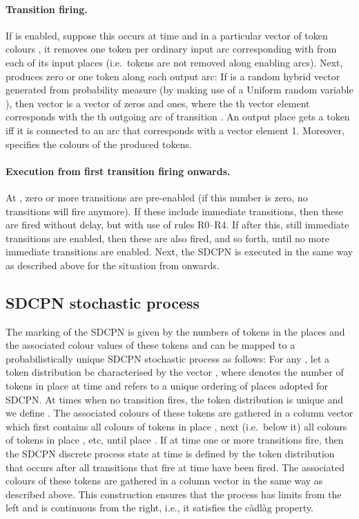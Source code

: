 \documentclass[copyright,creativecommons]{eptcs}
\begin{document}
\paragraph{Transition firing.}
If  is enabled, suppose this occurs at time 
and in a particular vector of token colours
, it removes one token per ordinary input arc corresponding
with  from each
of its input places (i.e.\ tokens are not removed along enabling arcs).
Next,  produces zero or one token along each output arc: If
 is a random hybrid
vector generated from probability measure 
(by making use of a Uniform random variable ), then
vector  is a vector of zeros and ones, where
the th vector element corresponds with the th outgoing
arc of transition . An output place gets a token iff it is
connected to an arc that corresponds with a vector element 1.
Moreover,  specifies the
colours of the produced tokens.

\paragraph{Execution from first transition firing onwards.}
At , zero or more transitions are pre-enabled (if this
number is zero, no transitions will fire anymore). If these
include immediate transitions, then these are fired without delay,
but with use of rules R0--R4. If after this, still immediate
transitions are enabled, then these are also fired, and so forth,
until no more immediate transitions are enabled.
Next, the SDCPN is executed in the same way as described above for
the situation from  onwards.


\subsection{SDCPN stochastic process}
\label{subsec:SDCPN process}

The marking of the SDCPN is given by the numbers of tokens in the
places and the associated colour values of these tokens and can be
mapped to a probabilistically unique SDCPN stochastic process
 as follows: For any , let a token
distribution be characterised by the vector , where 
denotes the number of tokens in place  at time  and  refers to a unique ordering of places adopted
for SDCPN. At times  when no transition
fires, the token distribution is unique and we define . The associated colours of these tokens are gathered in a
column vector  which first contains all colours of tokens in
place , next (i.e.\ below it) all colours of tokens in place
, etc, until place . If at time 
one or more transitions fire, then the SDCPN discrete process
state at time  is defined by  the token
distribution that occurs after all transitions that fire at time
 have been fired. The associated colours of these tokens
are gathered in a column vector  in the same way as
described above. This construction ensures that the process
 has limits from the left and is continuous from the
right, i.e., it satisfies the c\`adl\`ag property.
\end{document}
